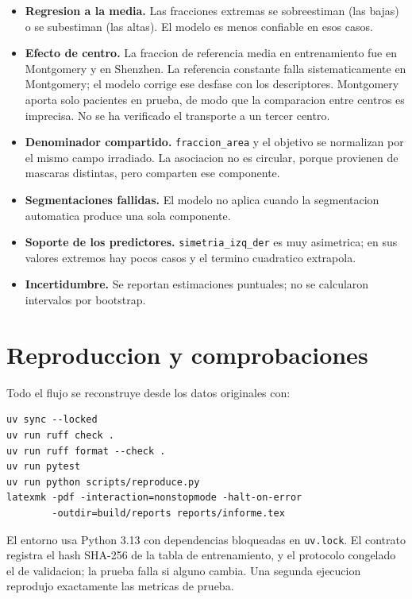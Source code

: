 \documentclass[11pt,a4paper]{article}
\begin{document}
\begin{itemize}
    \item \textbf{Regresion a la media.} Las fracciones extremas se sobreestiman
    (las bajas) o se subestiman (las altas). El modelo es menos confiable en
    esos casos.
    \item \textbf{Efecto de centro.} La fraccion de referencia media en
    entrenamiento fue \ModRefMediaMC{} en Montgomery y \ModRefMediaSH{} en
    Shenzhen. La referencia constante falla sistematicamente en Montgomery; el
    modelo corrige ese desfase con los descriptores. Montgomery aporta solo
    \ModNTestMC{} pacientes en prueba, de modo que la comparacion entre centros
    es imprecisa. No se ha verificado el transporte a un tercer centro.
    \item \textbf{Denominador compartido.} \texttt{fraccion\_area} y el objetivo
    se normalizan por el mismo campo irradiado. La asociacion no es circular,
    porque provienen de mascaras distintas, pero comparten ese componente.
    \item \textbf{Segmentaciones fallidas.} El modelo no aplica cuando la
    segmentacion automatica produce una sola componente.
    \item \textbf{Soporte de los predictores.} \texttt{simetria\_izq\_der} es muy
    asimetrica; en sus valores extremos hay pocos casos y el termino cuadratico
    extrapola.
    \item \textbf{Incertidumbre.} Se reportan estimaciones puntuales; no se
    calcularon intervalos por bootstrap.
\end{itemize}

\section{Reproduccion y comprobaciones}

Todo el flujo se reconstruye desde los datos originales con:

\begin{verbatim}
uv sync --locked
uv run ruff check .
uv run ruff format --check .
uv run pytest
uv run python scripts/reproduce.py
latexmk -pdf -interaction=nonstopmode -halt-on-error
        -outdir=build/reports reports/informe.tex
\end{verbatim}

El entorno usa Python 3.13 con dependencias bloqueadas en \texttt{uv.lock}. El
contrato registra el hash SHA-256 de la tabla de entrenamiento, y el protocolo
congelado el de validacion; la prueba falla si alguno cambia. Una segunda
ejecucion reprodujo exactamente las metricas de prueba.
\end{document}
